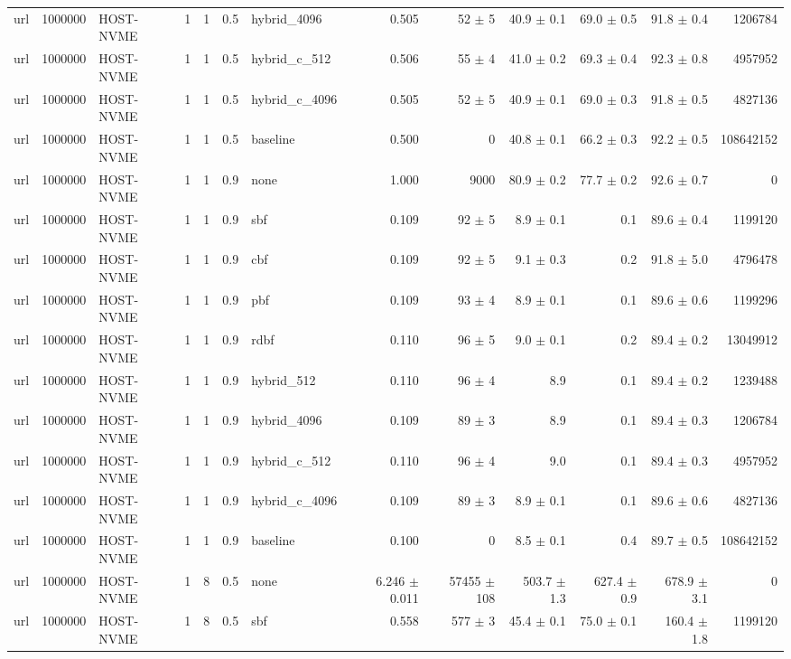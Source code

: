 \begin{tabular}{lllllllrrrrrr}
url & 1000000 & HOST-NVME & 1 & 1 & 0.5 & hybrid\_4096 & 0.505 & 52 $\pm$ 5 & 40.9 $\pm$ 0.1 & 69.0 $\pm$ 0.5 & 91.8 $\pm$ 0.4 & 1206784 \\
url & 1000000 & HOST-NVME & 1 & 1 & 0.5 & hybrid\_c\_512 & 0.506 & 55 $\pm$ 4 & 41.0 $\pm$ 0.2 & 69.3 $\pm$ 0.4 & 92.3 $\pm$ 0.8 & 4957952 \\
url & 1000000 & HOST-NVME & 1 & 1 & 0.5 & hybrid\_c\_4096 & 0.505 & 52 $\pm$ 5 & 40.9 $\pm$ 0.1 & 69.0 $\pm$ 0.3 & 91.8 $\pm$ 0.5 & 4827136 \\
url & 1000000 & HOST-NVME & 1 & 1 & 0.5 & baseline & 0.500 & 0 & 40.8 $\pm$ 0.1 & 66.2 $\pm$ 0.3 & 92.2 $\pm$ 0.5 & 108642152 \\
url & 1000000 & HOST-NVME & 1 & 1 & 0.9 & none & 1.000 & 9000 & 80.9 $\pm$ 0.2 & 77.7 $\pm$ 0.2 & 92.6 $\pm$ 0.7 & 0 \\
url & 1000000 & HOST-NVME & 1 & 1 & 0.9 & sbf & 0.109 & 92 $\pm$ 5 & 8.9 $\pm$ 0.1 & 0.1 & 89.6 $\pm$ 0.4 & 1199120 \\
url & 1000000 & HOST-NVME & 1 & 1 & 0.9 & cbf & 0.109 & 92 $\pm$ 5 & 9.1 $\pm$ 0.3 & 0.2 & 91.8 $\pm$ 5.0 & 4796478 \\
url & 1000000 & HOST-NVME & 1 & 1 & 0.9 & pbf & 0.109 & 93 $\pm$ 4 & 8.9 $\pm$ 0.1 & 0.1 & 89.6 $\pm$ 0.6 & 1199296 \\
url & 1000000 & HOST-NVME & 1 & 1 & 0.9 & rdbf & 0.110 & 96 $\pm$ 5 & 9.0 $\pm$ 0.1 & 0.2 & 89.4 $\pm$ 0.2 & 13049912 \\
url & 1000000 & HOST-NVME & 1 & 1 & 0.9 & hybrid\_512 & 0.110 & 96 $\pm$ 4 & 8.9 & 0.1 & 89.4 $\pm$ 0.2 & 1239488 \\
url & 1000000 & HOST-NVME & 1 & 1 & 0.9 & hybrid\_4096 & 0.109 & 89 $\pm$ 3 & 8.9 & 0.1 & 89.4 $\pm$ 0.3 & 1206784 \\
url & 1000000 & HOST-NVME & 1 & 1 & 0.9 & hybrid\_c\_512 & 0.110 & 96 $\pm$ 4 & 9.0 & 0.1 & 89.4 $\pm$ 0.3 & 4957952 \\
url & 1000000 & HOST-NVME & 1 & 1 & 0.9 & hybrid\_c\_4096 & 0.109 & 89 $\pm$ 3 & 8.9 $\pm$ 0.1 & 0.1 & 89.6 $\pm$ 0.6 & 4827136 \\
url & 1000000 & HOST-NVME & 1 & 1 & 0.9 & baseline & 0.100 & 0 & 8.5 $\pm$ 0.1 & 0.4 & 89.7 $\pm$ 0.5 & 108642152 \\
url & 1000000 & HOST-NVME & 1 & 8 & 0.5 & none & 6.246 $\pm$ 0.011 & 57455 $\pm$ 108 & 503.7 $\pm$ 1.3 & 627.4 $\pm$ 0.9 & 678.9 $\pm$ 3.1 & 0 \\
url & 1000000 & HOST-NVME & 1 & 8 & 0.5 & sbf & 0.558 & 577 $\pm$ 3 & 45.4 $\pm$ 0.1 & 75.0 $\pm$ 0.1 & 160.4 $\pm$ 1.8 & 1199120 \\

\end{tabular}
